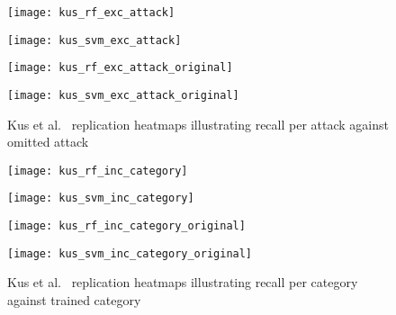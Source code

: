 \begin{figure}[htbp]
    \centering
    \begin{minipage}[h]{0.5\textwidth}
        \centering
        \texttt{[image: kus\_rf\_exc\_attack]}
    \end{minipage}\hfill
    \begin{minipage}[h]{0.5\textwidth}
        \centering
        \texttt{[image: kus\_svm\_exc\_attack]}
    \end{minipage}
    \begin{minipage}[h]{0.5\textwidth}
        \centering
        \texttt{[image: kus\_rf\_exc\_attack\_original]}
    \end{minipage}\hfill
    \begin{minipage}[h]{0.5\textwidth}
        \centering
        \texttt{[image: kus\_svm\_exc\_attack\_original]}
    \end{minipage}
    \caption[Kus et al.~\cite{Kus} Replication Attack Omission Heatmaps]{Kus et al.~\cite{Kus} replication heatmaps illustrating recall per attack against omitted attack\label{fig:kus_rep_exc_att}}
\end{figure}

\begin{figure}[htbp]
    \centering
    \begin{minipage}[h]{0.5\textwidth}
        \centering
        \texttt{[image: kus\_rf\_inc\_category]}
    \end{minipage}\hfill
    \begin{minipage}[h]{0.5\textwidth}
        \centering
        \texttt{[image: kus\_svm\_inc\_category]}
    \end{minipage}
    \begin{minipage}[h]{0.5\textwidth}
        \centering
        \texttt{[image: kus\_rf\_inc\_category\_original]}
    \end{minipage}\hfill
    \begin{minipage}[h]{0.5\textwidth}
        \centering
        \texttt{[image: kus\_svm\_inc\_category\_original]}
    \end{minipage}
    \caption[Kus et al.~\cite{Kus} Replication Single Category Heatmaps]{Kus et al.~\cite{Kus} replication heatmaps illustrating recall per category against trained category\label{fig:kus_rep_inc_cat}}
\end{figure}

